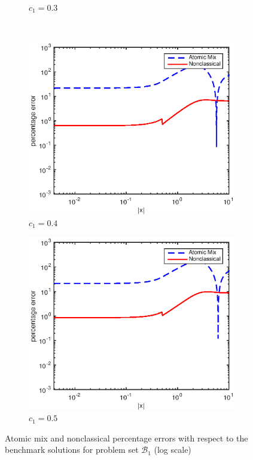 \documentclass[12pt]{article}
\newcommand{\setb}{\mathcal{B}}
\begin{document}
{\begin{figure}[p]
\begin{subfigure}{0.495\textwidth}
        \caption{$c_1 = 0.3$}
        \label{figerrD30}
    \end{subfigure}
    \\
    \centering
    \begin{subfigure}{0.495\textwidth}
        \centering
        \includegraphics[width=\textwidth]{NSE_err_D40.eps}
        \caption{$c_1 = 0.4$}
        \label{figerrD40}
    \end{subfigure}
    \hfill
    \begin{subfigure}{0.495\textwidth}
        \centering
        \includegraphics[width=\textwidth]{NSE_err_D50.eps}
        \caption{$c_1 = 0.5$}
        \label{figerrD50}
    \end{subfigure}
    \caption{Atomic mix and nonclassical percentage errors with respect to the benchmark solutions for problem set $\setb_1$ (log scale)}
    \label{figerrD1}
\end{figure}





}
\end{document}
